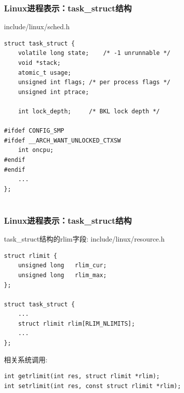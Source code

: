 \documentclass[xcolor=svgnames]{beamer}
\begin{document}
\begin{CJK*}{UTF8}{gbsn}
%





\begin{frame}[fragile]
\frametitle{Linux进程表示：task\_struct结构}
\begin{block}{include/linux/sched.h}
\begin{verbatim}
struct task_struct {
    volatile long state;    /* -1 unrunnable */
    void *stack;
    atomic_t usage;
    unsigned int flags; /* per process flags */
    unsigned int ptrace;

    int lock_depth;     /* BKL lock depth */

#ifdef CONFIG_SMP
#ifdef __ARCH_WANT_UNLOCKED_CTXSW
    int oncpu;
#endif
#endif
    ...
};


\end{verbatim}
\end{block}
\end{frame}


\begin{frame}[fragile]
\frametitle{Linux进程表示：task\_struct结构}
\begin{block}{task\_struct结构的rlim字段: include/linux/resource.h}
\begin{verbatim}
struct rlimit {
    unsigned long   rlim_cur;
    unsigned long   rlim_max;
};

struct task_struct {
    ...
    struct rlimit rlim[RLIM_NLIMITS];
    ...
};
\end{verbatim}
\end{block}
\begin{block}{相关系统调用:}
\begin{verbatim}
int getrlimit(int res, struct rlimit *rlim);
int setrlimit(int res, const struct rlimit *rlim);
\end{verbatim}
\end{block}
\end{frame}


\end{CJK*}
\end{document}
